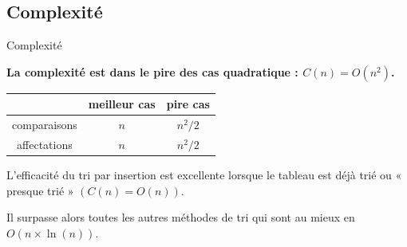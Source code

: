 \subsection{Complexité}

\begin{prop}{Complexité}
%
%
%


\textbf{La complexité est dans le pire des cas quadratique : $C(n)=O(n^2)$.}


\begin{center}
\begin{tabular}{|c|c|c|}
\hline 
\rule[-1ex]{0pt}{2.5ex}  & meilleur cas &  pire cas \\ 
\hline 
\rule[-1ex]{0pt}{2.5ex} comparaisons & $n$ & $n^2/2$ \\ 
\hline 
\rule[-1ex]{0pt}{2.5ex} affectations & $n$ & $n^2/2$ \\ 
\hline 
\end{tabular} 
\end{center}



L'efficacité du tri par insertion est excellente lorsque le tableau est déjà trié ou « presque trié » $(C(n)=O(n))$. 

Il surpasse alors toutes les autres méthodes de tri qui sont au mieux en $O(n \times \ln(n))$.
\end{prop}

